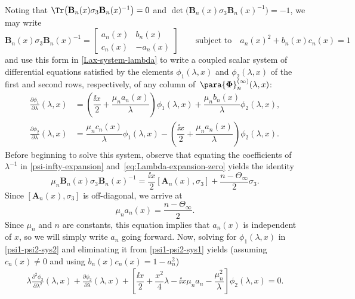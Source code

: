 Noting that $\Tr\big(\mathbf{B}_{n}(x)\sigma_3\mathbf{B}_{n}(x)^{-1}\big)=0$ and $\det \big(\mathbf{B}_{n}(x) \sigma_3 \mathbf{B}_{n}(x)^{-1}\big) = -1$, we may write
\begin{equation}
\mathbf{B}_{n}(x) \sigma_3 \mathbf{B}_{n}(x)^{-1} = \begin{bmatrix} a_n(x) & b_n(x) \\ c_n(x) & -a_n(x) \end{bmatrix} \qquad \text{subject to}\quad a_n(x)^2 + b_n(x)c_n(x) = 1
\label{eq:zero-coefficient-matrix}
\end{equation}
and use this form in \eqref{Lax-system-lambda} to write a coupled scalar system of differential equations satisfied by the elements $\phi_1(\lambda,x)$ and $\phi_2(\lambda,x)$ of the first and second rows, respectively, of any column of~$\para{\boldsymbol \Phi}_n^{(\infty)}(\lambda,x)$:
\begin{align}
\label{psi1-psi2-sys1} \frac{\partial\phi_{1}}{\partial\lambda}(\lambda,x) &= \left(\dfrac{\ii x}{2} + \dfrac{\mu_n a_n(x)}{\lambda}\right) \phi_1(\lambda,x) + \dfrac{\mu_n b_n(x)}{\lambda} \phi_2(\lambda,x), \\
\label{psi1-psi2-sys2} \frac{\partial\phi_{2}}{\partial\lambda}(\lambda,x) &= \dfrac{\mu_n c_n(x)}{\lambda} \phi_1(\lambda,x)-\left(\dfrac{\ii x}{2}+ \dfrac{\mu_n a_n(x)}{\lambda}\right) \phi_2(\lambda,x).
\end{align}
Before beginning to solve this system, observe that equating the coefficients of $\lambda^{-1}$ in \eqref{psi-infty-expansion} and~\eqref{eq:Lambda-expansion-zero} yields the identity
\begin{equation}
\label{C-A relation}
\mu_n \mathbf{B}_{n}(x) \sigma_3 \mathbf{B}_{n}(x)^{-1} = \dfrac{\ii x}{2} [\mathbf{A}_{n}(x), \sigma_3] + \dfrac{n - \Theta_\infty}{2} \sigma_3.
\end{equation}
Since $[\mathbf{A}_{n}(x), \sigma_3]$ is off-diagonal, we arrive at
\begin{equation}
\mu_n a_n(x) = \frac{n - \Theta_\infty}{2}.
\label{eq:little-an}
\end{equation}
Since $\mu_n$ and $n$ are constants, this equation implies that $a_n(x)$ is independent of $x$, so we will simply write $a_n$ going forward.
Now, solving for $\phi_1(\lambda,x)$ in \eqref{psi1-psi2-sys2} and eliminating it from \eqref{psi1-psi2-sys1} yields (assuming $c_n(x) \neq 0$ and using $b_n(x)c_n(x) = 1 - a_n^2$)
\begin{align*}
 \lambda \frac{\partial^2\phi_{2}}{\partial\lambda^2}(\lambda,x) + \frac{\partial\phi_{2}}{\partial\lambda}(\lambda,x) + \left[ \dfrac{\ii x}{2} + \dfrac{x^2}{4} \lambda - \ii x\mu_n a_n - \dfrac{\mu_n^2}{\lambda} \right]\phi_2(\lambda,x) = 0.
\end{align*}
